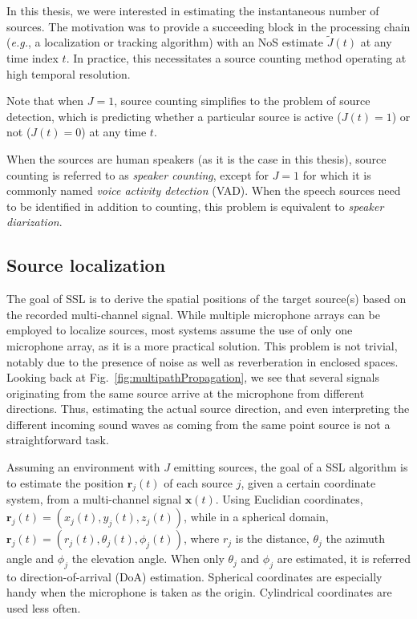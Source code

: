 In this thesis, we were interested in estimating the instantaneous number of sources. The motivation was to provide a succeeding block in the processing chain (\emph{e.g.}, a localization or tracking algorithm) with an NoS estimate $\tilde{J}(t)$ at any time index $t$. In practice, this necessitates a source counting method operating at high temporal resolution.

Note that when $J=1$, source counting simplifies to the problem of source detection, which is predicting whether a particular source is active ($J(t)=1$) or not ($J(t)=0$) at any time $t$.

When the sources are human speakers (as it is the case in this thesis), source counting is referred to as \textit{speaker counting}, except for $J=1$ for which it is commonly named \textit{voice activity detection} (VAD). When the speech sources need to be identified in addition to counting, this problem is equivalent to \textit{speaker diarization}.

\subsection{Source localization}

The goal of SSL is to derive the spatial positions of the target source(s) based on the recorded multi-channel signal. While multiple microphone arrays can be employed to localize sources, most systems assume the use of only one microphone array, as it is a more practical solution. This problem is not trivial, notably due to the presence of noise as well as reverberation in enclosed spaces. Looking back at Fig.~\ref{fig:multipathPropagation}, we see that several signals originating from the same source arrive at the microphone from different directions. Thus, estimating the actual source direction, and even interpreting the different incoming sound waves as coming from the same point source is not a straightforward task.

Assuming an environment with $J$ emitting sources, the goal of a SSL algorithm is to estimate the position $\mathbf{r}_j(t)$ of each source $j$, given a certain coordinate system, from a multi-channel signal $\mathbf{x}(t)$. Using Euclidian coordinates, $\mathbf{r}_j(t) = (x_j(t), y_j(t), z_j(t))$, while in a spherical domain, $\mathbf{r}_j(t) = (r_j(t), \theta_j(t), \phi_j(t))$, where $r_j$ is the distance, $\theta_j$ the azimuth angle and $\phi_j$ the elevation angle. When only $\theta_j$ and $\phi_j$ are estimated, it is referred to direction-of-arrival (DoA) estimation. Spherical coordinates are especially handy when the microphone is taken as the origin. Cylindrical coordinates are used less often. 

